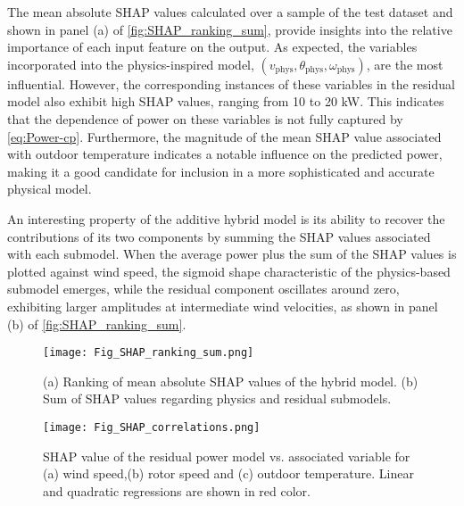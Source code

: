 \documentclass[preprint,12pt]{elsarticle}
\begin{document}
The mean absolute SHAP values calculated over a sample of the test dataset and shown in panel (a) of \autoref{fig:SHAP_ranking_sum}, provide insights into the relative importance of each input feature on the output. As expected, the variables incorporated into the physics-inspired model, $(v_\text{phys},\theta_\text{phys},\omega_\text{phys})$, are the most influential. However, the corresponding instances of these variables in the residual model also exhibit high SHAP values, ranging from 10 to 20 kW. This indicates that the dependence of power on these variables is not fully captured by \autoref{eq:Power-cp}. Furthermore, the magnitude of the mean SHAP value associated with outdoor temperature indicates a notable influence on the predicted power, making it a good candidate for inclusion in a more sophisticated and accurate physical model.

An interesting property of the additive hybrid model is its ability to recover the contributions of its two components by summing the SHAP values associated with each submodel. When the average power plus the sum of the SHAP values is plotted against wind speed, the sigmoid shape characteristic of the physics-based submodel emerges, while the residual component oscillates around zero, exhibiting larger amplitudes at intermediate wind velocities, as shown in panel (b) of \autoref{fig:SHAP_ranking_sum}.

\begin{figure}[t!]
    \centering
    \texttt{[image: Fig\_SHAP\_ranking\_sum.png]}
    \caption{(a) Ranking of mean absolute SHAP values of the hybrid model. (b) Sum of SHAP values regarding physics and residual submodels.}
    \label{fig:SHAP_ranking_sum}
\end{figure}

\begin{figure}[htbp]
    \centering
    \texttt{[image: Fig\_SHAP\_correlations.png]}
    \caption{SHAP value of the residual power model vs. associated variable for (a) wind speed,(b) rotor speed and (c) outdoor temperature. Linear and quadratic regressions are shown in red color.}
    \label{fig:SHAP_correlations}
\end{figure}
\end{document}
